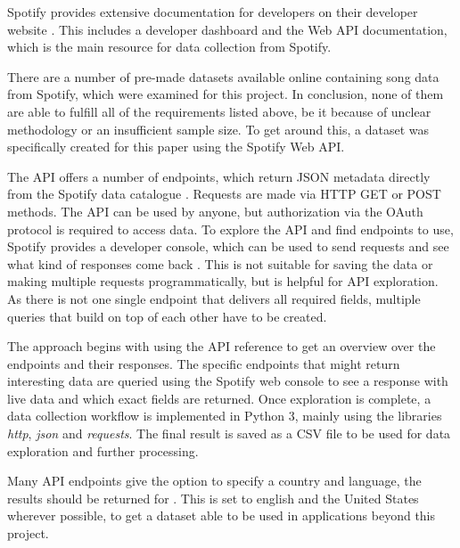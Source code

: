 Spotify provides extensive documentation for developers on their developer website \cite{SpotifyDev}.
This includes a developer dashboard and the Web API documentation, which is the main resource
for data collection from Spotify.

There are a number of pre-made datasets available online containing song data from Spotify,
which were examined for this project. In conclusion, none of them are able to fulfill
all of the requirements listed above, be it because of unclear methodology or an insufficient sample size.
To get around this, a dataset was specifically created for this paper using the Spotify Web API.

The \ac{API} offers a number of endpoints, which return \ac{JSON} metadata
directly from the Spotify data catalogue \cite{SpotifyWebAPI}.
Requests are made via HTTP GET or POST methods.
The \ac{API} can be used by anyone, but authorization via the OAuth protocol is required to access data.
To explore the \ac{API} and find endpoints to use, Spotify provides a developer console, which can be used to 
send requests and see what kind of responses come back \cite{SpotifyDevConsole}. This is not suitable for saving the data or making multiple
requests programmatically, but is helpful for API exploration. As there is not one single endpoint that delivers all
required fields, multiple queries that build on top of each other have to be created.

The approach begins with using the \ac{API} reference to get an overview over the endpoints and their responses.
The specific endpoints that might return interesting data are queried using the Spotify web console to see
a response with live data and which exact fields are returned.
Once exploration is complete, a data collection workflow is implemented in Python 3, mainly using the
libraries \emph{http}, \emph{json} and \emph{requests}. The final result is saved as a CSV file to be used for data exploration
and further processing.

Many API endpoints give the option to specify a country and language, the results should be returned for \cite{SpotifyAPIRef}.
This is set to english and the United States wherever possible, to get a dataset able to be used
in applications beyond this project.


